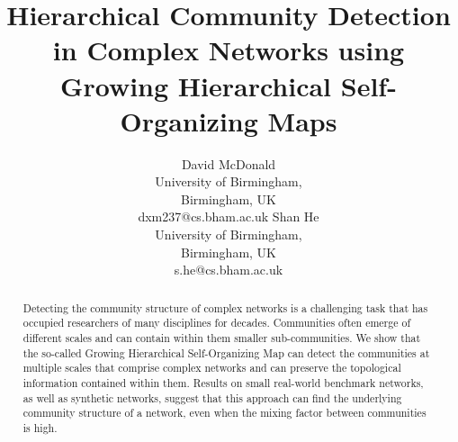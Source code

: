 \documentclass{article}
\title{Hierarchical Community Detection in Complex Networks using Growing Hierarchical Self-Organizing Maps}
\author{David McDonald \\ 
University of Birmingham, \\ Birmingham, UK  \\
dxm237@cs.bham.ac.uk
\And 
Shan He \\ 
University of Birmingham, \\ Birmingham, UK  \\
s.he@cs.bham.ac.uk}
\begin{document}
\maketitle

\begin{abstract}
Detecting the community structure of complex networks is a challenging task that has occupied researchers of many disciplines for decades.
Communities often emerge of different scales and can contain within them smaller sub-communities.
We show that the so-called Growing Hierarchical Self-Organizing Map can detect the communities at multiple scales that comprise complex networks and can preserve the topological information contained within them.
Results on small real-world benchmark networks, as well as synthetic networks, suggest that this approach can find the underlying community structure of a network, even when the mixing factor between communities is high. 
\end{abstract}
\end{document}
